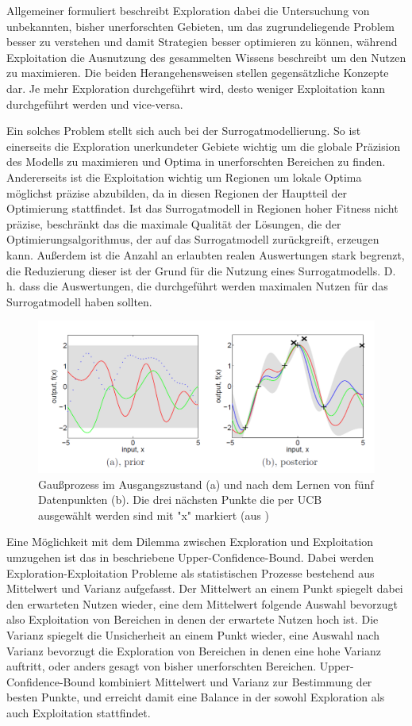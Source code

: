Allgemeiner formuliert beschreibt Exploration dabei die Untersuchung von unbekannten, bisher unerforschten Gebieten, um das zugrundeliegende Problem besser zu verstehen und damit Strategien besser optimieren zu können, während Exploitation die Ausnutzung des gesammelten Wissens beschreibt um den Nutzen zu maximieren.
Die beiden Herangehensweisen stellen gegensätzliche Konzepte dar.
Je mehr Exploration durchgeführt wird, desto weniger Exploitation kann durchgeführt werden und vice-versa.

Ein solches Problem stellt sich auch bei der Surrogatmodellierung.
So ist einerseits die Exploration unerkundeter Gebiete wichtig um die globale Präzision des Modells zu maximieren und Optima in unerforschten Bereichen zu finden.
Andererseits ist die Exploitation wichtig um Regionen um lokale Optima möglichst präzise abzubilden, da in diesen Regionen der Hauptteil der Optimierung stattfindet.
Ist das Surrogatmodell in Regionen hoher Fitness nicht präzise, beschränkt das die maximale Qualität der Lösungen, die der Optimierungsalgorithmus, der auf das Surrogatmodell zurückgreift, erzeugen kann.
Außerdem ist die Anzahl an erlaubten realen Auswertungen stark begrenzt, die Reduzierung dieser ist der Grund für die Nutzung eines Surrogatmodells.
D. h. dass die Auswertungen, die durchgeführt werden maximalen Nutzen für das Surrogatmodell haben sollten.

\begin{figure}[h]
	\centering
	\includegraphics[width=1\linewidth]{bilder/ucb}
	\caption{Gaußprozess im Ausgangszustand (a) und nach dem Lernen von fünf Datenpunkten (b). Die drei nächsten Punkte die per UCB ausgewählt werden sind mit "x" markiert (aus \cite{Rasmussen.2008})}
	\label{fig:ucb}
\end{figure}
Eine Möglichkeit mit dem Dilemma zwischen Exploration und Exploitation umzugehen ist das in \cite{Auer.2002} beschriebene Upper-Confidence-Bound. Dabei werden Exploration-Exploitation Probleme als statistischen Prozesse bestehend aus Mittelwert und Varianz aufgefasst.
Der Mittelwert an einem Punkt spiegelt dabei den erwarteten Nutzen wieder, eine dem Mittelwert folgende Auswahl bevorzugt also Exploitation von Bereichen in denen der erwartete Nutzen hoch ist.
Die Varianz spiegelt die Unsicherheit an einem Punkt wieder, eine Auswahl nach Varianz bevorzugt die Exploration von Bereichen in denen eine hohe Varianz auftritt, oder anders gesagt von bisher unerforschten Bereichen.
Upper-Confidence-Bound kombiniert Mittelwert und Varianz zur Bestimmung der besten Punkte, und erreicht damit eine Balance in der sowohl Exploration als auch Exploitation stattfindet.

